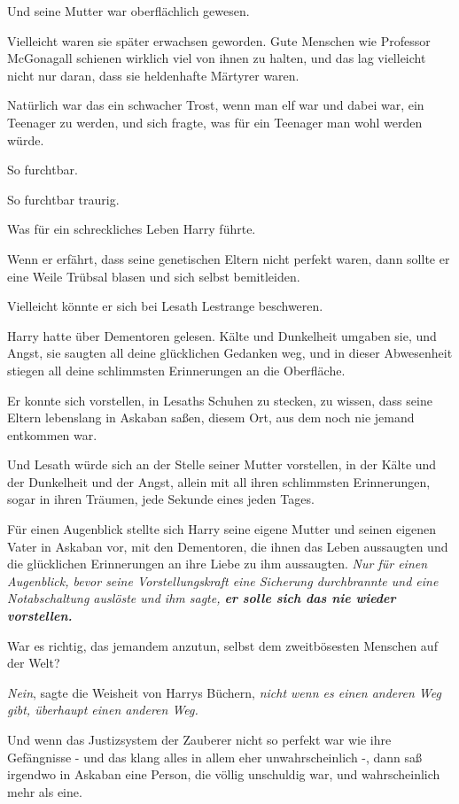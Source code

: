 Und seine Mutter war oberflächlich gewesen.

Vielleicht waren sie später erwachsen geworden. Gute Menschen wie Professor
McGonagall schienen wirklich viel von ihnen zu halten, und das lag vielleicht
nicht nur daran, dass sie heldenhafte Märtyrer waren.

Natürlich war das ein schwacher Trost, wenn man elf war und dabei war, ein
Teenager zu werden, und sich fragte, was für ein Teenager man wohl werden würde.

So furchtbar.

So furchtbar traurig.

Was für ein schreckliches Leben Harry führte.

Wenn er erfährt, dass seine genetischen Eltern nicht perfekt waren, dann sollte
er eine Weile Trübsal blasen und sich selbst bemitleiden.

Vielleicht könnte er sich bei Lesath Lestrange beschweren.

Harry hatte über Dementoren gelesen. Kälte und Dunkelheit umgaben sie, und
Angst, sie saugten all deine glücklichen Gedanken weg, und in dieser Abwesenheit
stiegen all deine schlimmsten Erinnerungen an die Oberfläche.

Er konnte sich vorstellen, in Lesaths Schuhen zu stecken, zu wissen, dass seine
Eltern lebenslang in Askaban saßen, diesem Ort, aus dem noch nie jemand
entkommen war.

Und Lesath würde sich an der Stelle seiner Mutter vorstellen, in der Kälte und
der Dunkelheit und der Angst, allein mit all ihren schlimmsten Erinnerungen,
sogar in ihren Träumen, jede Sekunde eines jeden Tages.

Für einen Augenblick stellte sich Harry seine eigene Mutter und seinen eigenen
Vater in Askaban vor, mit den Dementoren, die ihnen das Leben aussaugten und die
glücklichen Erinnerungen an ihre Liebe zu ihm aussaugten. \emph{Nur für einen
Augenblick, bevor seine Vorstellungskraft eine Sicherung durchbrannte und eine
Notabschaltung auslöste und ihm sagte, \textbf{er solle sich das nie wieder
vorstellen.}}

War es richtig, das jemandem anzutun, selbst dem zweitbösesten Menschen auf der
Welt?

\emph{Nein}, sagte die Weisheit von Harrys Büchern, \emph{nicht wenn es einen
anderen Weg gibt, überhaupt einen anderen Weg.}

Und wenn das Justizsystem der Zauberer nicht so perfekt war wie ihre Gefängnisse
- und das klang alles in allem eher unwahrscheinlich -, dann saß irgendwo in
Askaban eine Person, die völlig unschuldig war, und wahrscheinlich mehr als
eine.


